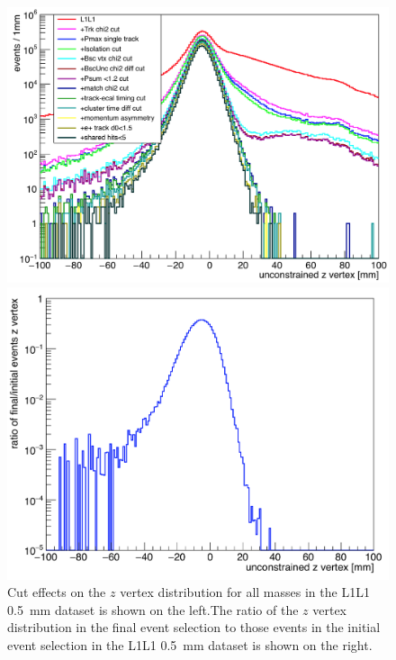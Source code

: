 \begin{figure}[hbt]
\begin{minipage}{0.5\textwidth}
\includegraphics[width=\textwidth]{pics/searching/L1L1_zvtx.png}
\end{minipage}\hfill\begin{minipage}{0.5\textwidth}
 \includegraphics[width=\textwidth]{pics/searching/ratio_zvtx_cuts.png}
 \end{minipage}
 \caption[Cut effects on the $z$ vertex distribution]{Cut effects on the $z$ vertex distribution for all masses in the L1L1 0.5~mm dataset is shown on the left.The ratio of the $z$ vertex distribution in the final event selection to those events in the initial event selection in the L1L1 0.5~mm dataset is shown on the right.}
  \label{fig:l1l1_vtx}
\end{figure}
